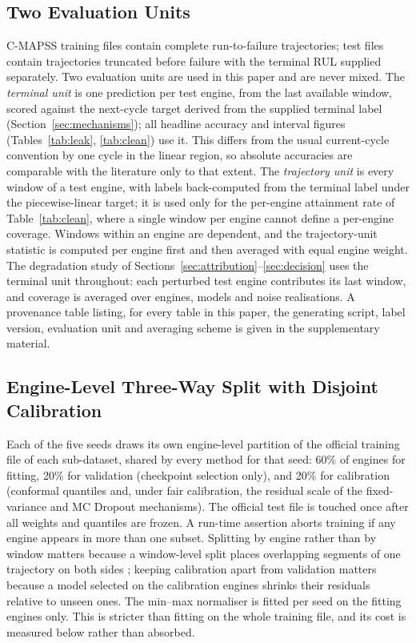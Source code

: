 \documentclass[journal]{IEEEtran}
\begin{document}
\subsection{Two Evaluation Units}
C-MAPSS training files contain complete run-to-failure trajectories; test files contain trajectories truncated before failure with the terminal RUL supplied separately. Two evaluation units are used in this paper and are never mixed. The \emph{terminal unit} is one prediction per test engine, from the last available window, scored against the next-cycle target derived from the supplied terminal label (Section~\ref{sec:mechanisms}); all headline accuracy and interval figures (Tables~\ref{tab:leak}, \ref{tab:clean}) use it. This differs from the usual current-cycle convention by one cycle in the linear region, so absolute accuracies are comparable with the literature only to that extent. The \emph{trajectory unit} is every window of a test engine, with labels back-computed from the terminal label under the piecewise-linear target; it is used only for the per-engine attainment rate of Table~\ref{tab:clean}, where a single window per engine cannot define a per-engine coverage. Windows within an engine are dependent, and the trajectory-unit statistic is computed per engine first and then averaged with equal engine weight. The degradation study of Sections~\ref{sec:attribution}--\ref{sec:decision} uses the terminal unit throughout: each perturbed test engine contributes its last window, and coverage is averaged over engines, models and noise realisations. A provenance table listing, for every table in this paper, the generating script, label version, evaluation unit and averaging scheme is given in the supplementary material.

\subsection{Engine-Level Three-Way Split with Disjoint Calibration}
Each of the five seeds draws its own engine-level partition of the official training file of each sub-dataset, shared by every method for that seed: 60\% of engines for fitting, 20\% for validation (checkpoint selection only), and 20\% for calibration (conformal quantiles and, under fair calibration, the residual scale of the fixed-variance and MC Dropout mechanisms). The official test file is touched once after all weights and quantiles are frozen. A run-time assertion aborts training if any engine appears in more than one subset. Splitting by engine rather than by window matters because a window-level split places overlapping segments of one trajectory on both sides \cite{shamim2026}; keeping calibration apart from validation matters because a model selected on the calibration engines shrinks their residuals relative to unseen ones. The min--max normaliser is fitted per seed on the fitting engines only. This is stricter than fitting on the whole training file, and its cost is measured below rather than absorbed.
\end{document}
